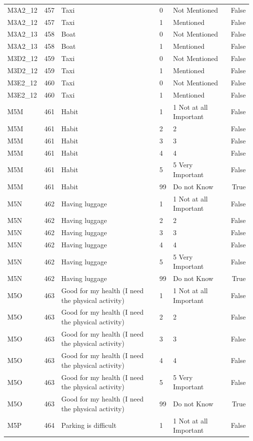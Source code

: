 \begin{tabular}{lrlllr}
M3A2_12 & 457 & Taxi & 0 & Not Mentioned & False \\
M3A2_12 & 457 & Taxi & 1 & Mentioned & False \\
M3A2_13 & 458 & Boat & 0 & Not Mentioned & False \\
M3A2_13 & 458 & Boat & 1 & Mentioned & False \\
M3D2_12 & 459 & Taxi & 0 & Not Mentioned & False \\
M3D2_12 & 459 & Taxi & 1 & Mentioned & False \\
M3E2_12 & 460 & Taxi & 0 & Not Mentioned & False \\
M3E2_12 & 460 & Taxi & 1 & Mentioned & False \\
M5M & 461 & Habit & 1 & 1 Not at all Important & False \\
M5M & 461 & Habit & 2 & 2 & False \\
M5M & 461 & Habit & 3 & 3 & False \\
M5M & 461 & Habit & 4 & 4 & False \\
M5M & 461 & Habit & 5 & 5 Very Important & False \\
M5M & 461 & Habit & 99 & Do not Know & True \\
M5N & 462 & Having luggage & 1 & 1 Not at all Important & False \\
M5N & 462 & Having luggage & 2 & 2 & False \\
M5N & 462 & Having luggage & 3 & 3 & False \\
M5N & 462 & Having luggage & 4 & 4 & False \\
M5N & 462 & Having luggage & 5 & 5 Very Important & False \\
M5N & 462 & Having luggage & 99 & Do not Know & True \\
M5O & 463 & Good for my health (I need the physical activity) & 1 & 1 Not at all Important & False \\
M5O & 463 & Good for my health (I need the physical activity) & 2 & 2 & False \\
M5O & 463 & Good for my health (I need the physical activity) & 3 & 3 & False \\
M5O & 463 & Good for my health (I need the physical activity) & 4 & 4 & False \\
M5O & 463 & Good for my health (I need the physical activity) & 5 & 5 Very Important & False \\
M5O & 463 & Good for my health (I need the physical activity) & 99 & Do not Know & True \\
M5P & 464 & Parking is difficult & 1 & 1 Not at all Important & False \\

\end{tabular}
